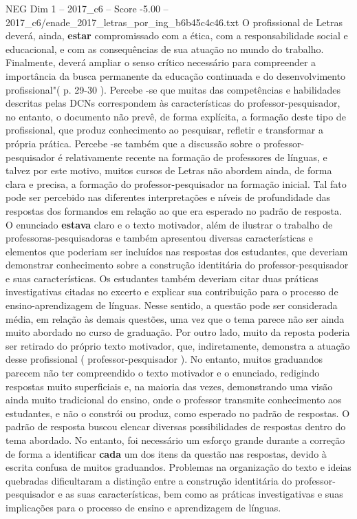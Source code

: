 \begin{textsample}{NEG Dim 1 – 2017\_c6 – Score -5.00 – 2017\_c6/enade\_2017\_letras\_por\_ing\_b6b45c4c46.txt}
O profissional de Letras deverá, ainda, \textbf{estar} compromissado com a ética, com a responsabilidade social e educacional, e com as consequências de sua atuação no mundo do trabalho.
Finalmente, deverá ampliar o senso crítico necessário para compreender a importância da busca permanente da educação continuada e do desenvolvimento profissional"( p. 29-30 ).
Percebe -se que muitas das competências e habilidades descritas pelas DCNs correspondem às características do professor-pesquisador, no entanto, o documento não prevê, de forma explícita, a formação deste tipo de profissional, que produz conhecimento ao pesquisar, refletir e transformar a própria prática.
Percebe -se também que a discussão sobre o professor-pesquisador é relativamente recente na formação de professores de línguas, e talvez por este motivo, muitos cursos de Letras não abordem ainda, de forma clara e precisa, a formação do professor-pesquisador na formação inicial.
Tal fato pode ser percebido nas diferentes interpretações e níveis de profundidade das respostas dos formandos em relação ao que era esperado no padrão de resposta.
O enunciado \textbf{estava} claro e o texto motivador, além de ilustrar o trabalho de professoras-pesquisadoras e também apresentou diversas características e elementos que poderiam ser incluídos nas respostas dos estudantes, que deveriam demonstrar conhecimento sobre a construção identitária do professor-pesquisador e suas características.
Os estudantes também deveriam citar duas práticas investigativas citadas no excerto e explicar sua contribuição para o processo de ensino-aprendizagem de línguas.
Nesse sentido, a questão pode ser considerada média, em relação às demais questões, uma vez que o tema parece não ser ainda muito abordado no curso de graduação.
Por outro lado, muito da reposta poderia ser retirado do próprio texto motivador, que, indiretamente, demonstra a atuação desse profissional ( professor-pesquisador ).
No entanto, muitos graduandos parecem não ter compreendido o texto motivador e o enunciado, redigindo respostas muito superficiais e, na maioria das vezes, demonstrando uma visão ainda muito tradicional do ensino, onde o professor transmite conhecimento aos estudantes, e não o constrói ou produz, como esperado no padrão de respostas.
O padrão de resposta buscou elencar diversas possibilidades de respostas dentro do tema abordado.
No entanto, foi necessário um esforço grande durante a correção de forma a identificar \textbf{cada} um dos itens da questão nas respostas, devido à escrita confusa de muitos graduandos.
Problemas na organização do texto e ideias quebradas dificultaram a distinção entre a construção identitária do professor-pesquisador e as suas características, bem como as práticas investigativas e suas implicações para o processo de ensino e aprendizagem de línguas.

\end{textsample}

